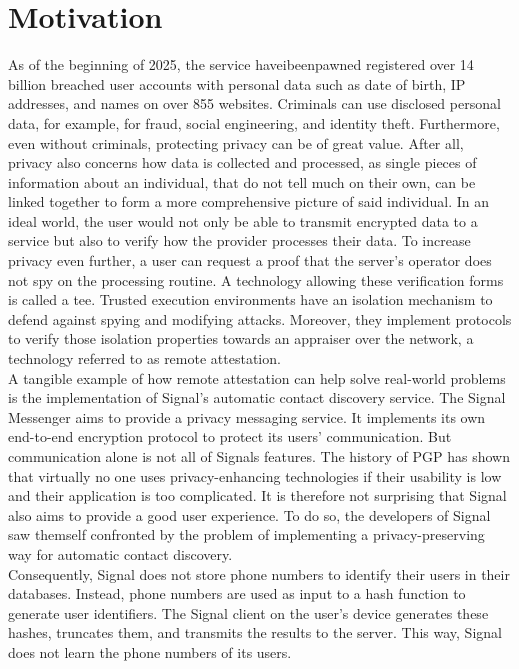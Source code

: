 \section{Motivation}
\label{sec:10:motivation}
As of the beginning of 2025, the service haveibeenpawned registered over 14
billion breached user accounts with personal data such as date of birth, IP
addresses, and names on over 855 websites.\cite{haveibeenpawned} Criminals can
use disclosed personal data, for example, for fraud, social engineering, and
identity theft. Furthermore, even without criminals, protecting privacy can be
of great value. After all, privacy also concerns how data is collected and
processed, as single pieces of information about an individual, that do not tell
much on their own, can be linked together to form a more comprehensive picture
of said individual.\cite{solove2007ve} In an ideal world, the user would not
only be able to transmit encrypted data to a service but also to verify how the
provider processes their data. To increase privacy even further, a user can
request a proof that the server's operator does not spy on the processing
routine. A technology allowing these verification forms is called a \gls{tee}.
Trusted execution environments have an isolation mechanism to defend against
spying and modifying attacks. Moreover, they implement protocols to verify those
isolation properties towards an appraiser over the network, a technology
referred to as remote attestation. \\

A tangible example of how remote attestation can help solve real-world problems
is the implementation of Signal's automatic contact discovery service. The
Signal Messenger aims to provide a privacy messaging service. It implements its
own end-to-end encryption protocol to protect its users'
communication.\cite{cohn2020formal} But communication alone is not all of
Signals features. The history of PGP has shown that virtually no one uses
privacy-enhancing technologies if their usability is low and their application
is too complicated.\cite{ruoti2015johnny} It is therefore not surprising that
Signal also aims to provide a good user experience. To do so, the developers of
Signal saw themself confronted by the problem of implementing a
privacy-preserving way for automatic contact discovery.\cite{SignalCd}\\

Consequently, Signal does not store phone numbers to identify their users in
their databases. Instead, phone numbers are used as input to a hash function to
generate user identifiers. The Signal client on the user's device generates
these hashes, truncates them, and transmits the results to the server. This way,
Signal does not learn the phone numbers of its users.\\

